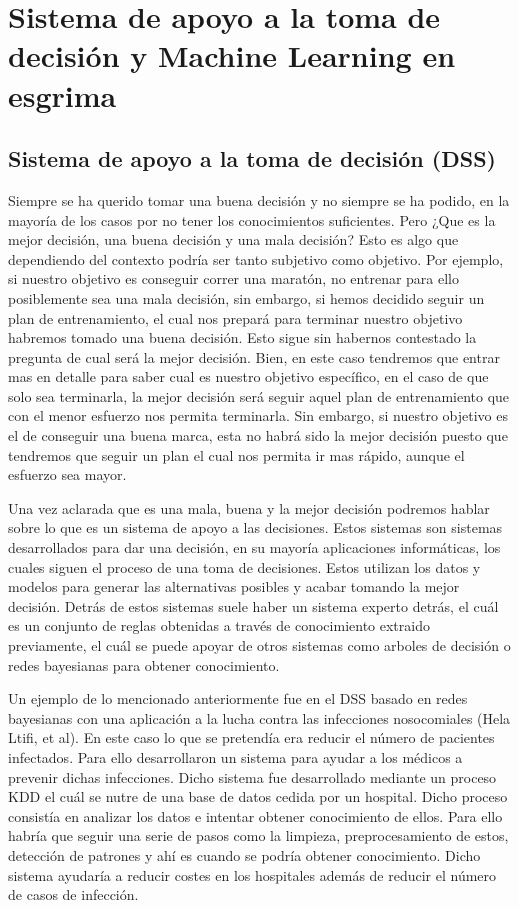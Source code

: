 \newline

\section{Sistema de apoyo a la toma de decisión y Machine Learning en esgrima}
\subsection{Sistema de apoyo a la toma de decisión (DSS)}

Siempre se ha querido tomar una buena decisión y no siempre se ha podido, en la mayoría de los casos
por no tener los conocimientos suficientes. Pero ¿Que es la mejor decisión, una buena decisión y una mala decisión?
Esto es algo que dependiendo del contexto podría ser tanto subjetivo como objetivo. Por ejemplo, si nuestro
objetivo es conseguir correr una maratón, no entrenar para ello posiblemente sea una mala decisión,
sin embargo, si hemos decidido seguir un plan de entrenamiento, el cual nos prepará para terminar
nuestro objetivo habremos tomado una buena decisión. Esto sigue sin habernos contestado la pregunta
de cual será la mejor decisión. Bien, en este caso tendremos que entrar mas en detalle para saber
cual es nuestro objetivo específico, en el caso de que solo sea terminarla, la mejor decisión será seguir aquel
plan de entrenamiento que con el menor esfuerzo nos permita terminarla. Sin embargo, si nuestro objetivo
es el de conseguir una buena marca, esta no habrá sido la mejor decisión puesto que tendremos que
seguir un plan el cual nos permita ir mas rápido, aunque el esfuerzo sea mayor.

Una vez aclarada que es una mala, buena y la mejor decisión podremos hablar sobre lo que es un sistema
de apoyo a las decisiones. Estos sistemas son sistemas desarrollados para dar una decisión, en su mayoría
aplicaciones informáticas, los cuales siguen el proceso de una toma de decisiones. Estos utilizan
los datos y modelos para generar las alternativas posibles y acabar tomando la mejor decisión. Detrás
de estos sistemas suele haber un sistema experto detrás, el cuál es un conjunto de reglas obtenidas
a través de conocimiento extraido previamente, el cuál se puede apoyar de otros sistemas como
arboles de decisión o redes bayesianas para obtener conocimiento.

Un ejemplo de lo mencionado anteriormente fue en el DSS basado en redes bayesianas con una aplicación
a la lucha contra las infecciones nosocomiales (Hela Ltifi, et al). En este caso lo que se pretendía
era reducir el número de pacientes infectados. Para ello desarrollaron un sistema para ayudar a los
médicos a prevenir dichas infecciones. Dicho sistema fue desarrollado mediante un proceso KDD el
cuál se nutre de una base de datos cedida por un hospital. Dicho proceso consistía en analizar los datos
e intentar obtener conocimiento de ellos. Para ello habría que seguir una serie de pasos como la
limpieza, preprocesamiento de estos, detección de patrones y ahí es cuando se podría obtener conocimiento.
Dicho sistema ayudaría a reducir costes en los hospitales además de reducir el número de casos de infección.

